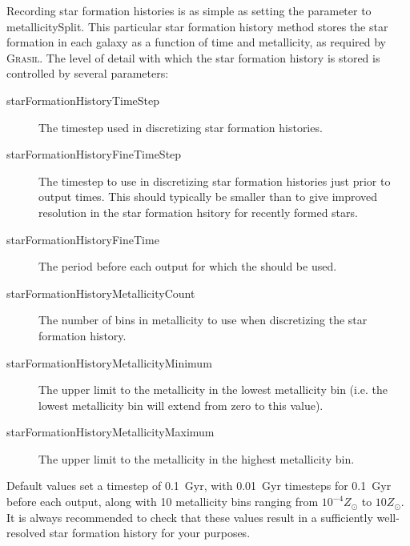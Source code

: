 Recording star formation histories is as simple as setting the {\normalfont \ttfamily [starFormationHistoriesMethod]} parameter to {\normalfont \ttfamily metallicitySplit}. This particular star formation history method stores the star formation in each galaxy as a function of time and metallicity, as required by {\normalfont \scshape Grasil}. The level of detail with which the star formation history is stored is controlled by several parameters:
\begin{description}
\item [{\normalfont \ttfamily starFormationHistoryTimeStep}] The timestep used in discretizing star formation histories.
\item [{\normalfont \ttfamily starFormationHistoryFineTimeStep}] The timestep to use in discretizing star formation histories just prior to output times. This should typically be smaller than {\normalfont \ttfamily [starFormationHistoryTimeStep]} to give improved resolution in the star formation hsitory for recently formed stars.
\item [{\normalfont \ttfamily starFormationHistoryFineTime}] The period before each output for which the {\normalfont \ttfamily [starFormationHistoryFineTimeStep]} should be used.
\item [{\normalfont \ttfamily starFormationHistoryMetallicityCount}] The number of bins in metallicity to use when discretizing the star formation history.
\item [{\normalfont \ttfamily starFormationHistoryMetallicityMinimum}] The upper limit to the metallicity in the lowest metallicity bin (i.e. the lowest metallicity bin will extend from zero to this value).
\item [{\normalfont \ttfamily starFormationHistoryMetallicityMaximum}] The upper limit to the metallicity in the highest metallicity bin.
\end{description}
Default values set a timestep of 0.1~Gyr, with 0.01~Gyr timesteps for 0.1~Gyr before each output, along with 10 metallicity bins ranging from $10^{-4}Z_\odot$ to $10Z_\odot$. It is always recommended to check that these values result in a sufficiently well-resolved star formation history for your purposes.

